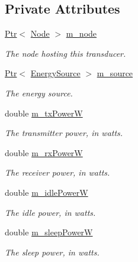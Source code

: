 \subsection*{Private Attributes}
\begin{DoxyCompactItemize}
\item 
\hyperlink{classns3_1_1Ptr}{Ptr}$<$ \hyperlink{classns3_1_1Node}{Node} $>$ \hyperlink{classns3_1_1AcousticModemEnergyModel_af88231291cb4fe9dd914ac4b336d168b}{m\+\_\+node}
\begin{DoxyCompactList}\small\item\em The node hosting this transducer. \end{DoxyCompactList}\item 
\hyperlink{classns3_1_1Ptr}{Ptr}$<$ \hyperlink{classns3_1_1EnergySource}{Energy\+Source} $>$ \hyperlink{classns3_1_1AcousticModemEnergyModel_a049dd286b8a9b5b7178132d7f2ed65f8}{m\+\_\+source}
\begin{DoxyCompactList}\small\item\em The energy source. \end{DoxyCompactList}\item 
double \hyperlink{classns3_1_1AcousticModemEnergyModel_a39960d270366b5ff4a83d32c077b44a2}{m\+\_\+tx\+PowerW}
\begin{DoxyCompactList}\small\item\em The transmitter power, in watts. \end{DoxyCompactList}\item 
double \hyperlink{classns3_1_1AcousticModemEnergyModel_a1d81af5908e48e1e9c995306ab19d9bd}{m\+\_\+rx\+PowerW}
\begin{DoxyCompactList}\small\item\em The receiver power, in watts. \end{DoxyCompactList}\item 
double \hyperlink{classns3_1_1AcousticModemEnergyModel_a2a4d8c7f2c572c056086ea37d087ff42}{m\+\_\+idle\+PowerW}
\begin{DoxyCompactList}\small\item\em The idle power, in watts. \end{DoxyCompactList}\item 
double \hyperlink{classns3_1_1AcousticModemEnergyModel_ab65c0e46edd757bd1159ed7fddc1336a}{m\+\_\+sleep\+PowerW}
\begin{DoxyCompactList}\small\item\em The sleep power, in watts. \end{DoxyCompactList}\item 

\end{DoxyCompactItemize}
